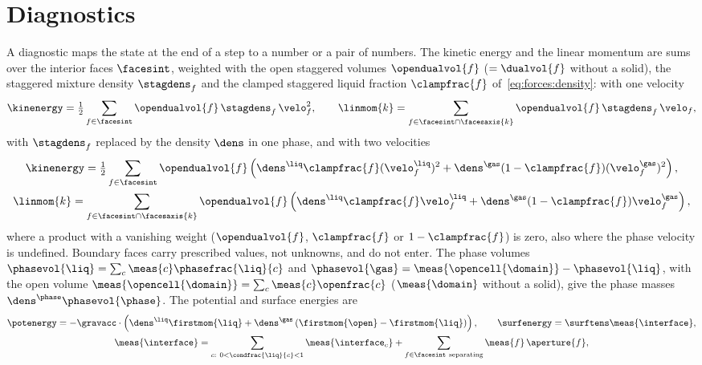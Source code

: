\section{Diagnostics}\label{sec:verif:diagnostics}
A diagnostic maps the state at the end of a step to a number or a pair of
numbers. The kinetic energy and the linear momentum are sums over the
interior faces $\facesint$, weighted with the open staggered volumes
$\opendualvol{f}$ ($=\dualvol{f}$ without a solid), the staggered mixture
density $\stagdens_f$ and the clamped staggered liquid fraction
$\clampfrac{f}$ of~\cref{eq:forces:density}: with one velocity
\begin{equation}\label{eq:verif:energy}
  \kinenergy=\tfrac12\sum_{f\in\facesint}\opendualvol{f}\,\stagdens_f\,\velo_f^2,\qquad
  \linmom{k}=\sum_{f\in\facesint\cap\facesaxis{k}}\opendualvol{f}\,\stagdens_f\,\velo_f ,
\end{equation}
with $\stagdens_f$ replaced by the density $\dens$ in one phase, and with two
velocities
\begin{equation}\label{eq:verif:energy-two}
  \begin{gathered}
  \kinenergy=\tfrac12\sum_{f\in\facesint}\opendualvol{f}\roundpar{\dens^{\liq}\clampfrac{f}(\velo^{\liq}_f)^2+\dens^{\gas}(1-\clampfrac{f})(\velo^{\gas}_f)^2},\\
  \linmom{k}=\sum_{f\in\facesint\cap\facesaxis{k}}\opendualvol{f}\roundpar{\dens^{\liq}\clampfrac{f}\velo^{\liq}_f+\dens^{\gas}(1-\clampfrac{f})\velo^{\gas}_f},
  \end{gathered}
\end{equation}
where a product with a vanishing weight ($\opendualvol{f}$, $\clampfrac{f}$
or $1-\clampfrac{f}$) is zero, also where the phase velocity is undefined.
Boundary faces carry prescribed values, not unknowns,
and do not enter. The phase volumes
$\phasevol{\liq}=\sum_c\meas{c}\phasefrac{\liq}{c}$ and
$\phasevol{\gas}=\meas{\opencell{\domain}}-\phasevol{\liq}$, with the open
volume $\meas{\opencell{\domain}}=\sum_c\meas{c}\openfrac{c}$
($\meas{\domain}$ without a solid), give the phase masses
$\dens^{\phase}\phasevol{\phase}$. The potential and surface energies are
\begin{equation}\label{eq:verif:energies}
  \begin{gathered}
  \potenergy=-\gravacc\cdot\roundpar{\dens^{\liq}\firstmom{\liq}+\dens^{\gas}\roundpar{\firstmom{\open}-\firstmom{\liq}}},\qquad
  \surfenergy=\surftens\meas{\interface},\\
  \meas{\interface}=\sum_{c:\ 0<\condfrac{\liq}{c}<1}\meas{\interface_c}
    +\sum_{f\in\facesint\ \text{separating}}\meas{f}\,\aperture{f},
  \end{gathered}
\end{equation}
